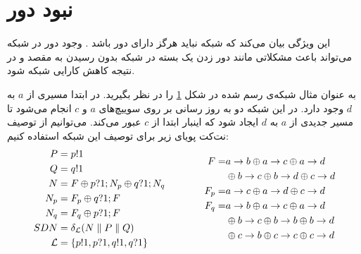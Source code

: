 \section{نبود دور}
این ویژگی بیان می‌کند که شبکه‌ نباید هرگز دارای دور باشد
\cite{foerster2018survey}.
وجود دور در شبکه می‌تواند باعث مشکلاتی مانند دور زدن یک بسته در شبکه بدون رسیدن به مقصد و در نتیجه کاهش کارایی شبکه شود.
\begin{figure}
    \centering
    \caption{ }
    \label{fig:loop}
\end{figure}
به عنوان مثال شبکه‌ی رسم شده در شکل
\ref{fig:loop}
را در نظر بگیرید.
در ابتدا مسیری از
$a$
به
$d$
وجود دارد.
در این شبکه دو به روز رسانی بر روی سوییچ‌های
$a$
و
$c$
انجام می‌شود تا مسیر جدیدی از
$a$
به
$d$
ایجاد شود که اینبار ابتدا از
$c$
عبور می‌کند.
می‌توانیم از توصیف نت‌کت پویای زیر برای توصیف این شبکه استفاده کنیم:
\begin{equation*}
    \begin{aligned}
        P           & = p!1                                             \\
        Q           & = q!1                                             \\
        N           & = F \oplus p?1;N_p \oplus q?1;N_q                 \\
        N_p         & = F_p \oplus q?1;F                                \\
        N_q         & = F_q \oplus p?1;F                                \\
        SDN         & = \delta_{\mathcal{L}}(N \parallel P \parallel Q) \\
        \mathcal{L} & = \{p!1,p?1,q!1,q?1\}
    \end{aligned}
    \qquad \qquad
    \begin{aligned}
        F    = & a\rightarrow b \oplus a\rightarrow c \oplus a\rightarrow d               \\
               & \oplus b\rightarrow c \oplus b\rightarrow d \oplus c\rightarrow d        \\
        F_p  = & a\rightarrow c \oplus a\rightarrow d \oplus c\rightarrow d               \\
        F_q  = & a\rightarrow b \oplus a\rightarrow c \oplus a\rightarrow d               \\
               & \oplus b\rightarrow c \oplus b\rightarrow b \oplus b\rightarrow d        \\
               & \oplus        c\rightarrow b \oplus c\rightarrow c \oplus c\rightarrow d
    \end{aligned}
\end{equation*}
